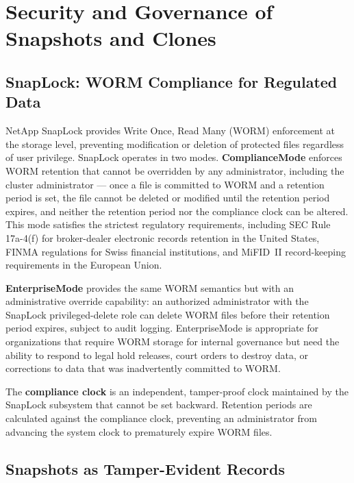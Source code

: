 \section{Security and Governance of Snapshots and Clones}

\begin{securitybox}

\subsection*{SnapLock: WORM Compliance for Regulated Data}

NetApp SnapLock provides Write Once, Read Many (WORM) enforcement at the storage level, preventing modification or deletion of protected files regardless of user privilege. SnapLock operates in two modes. \textbf{ComplianceMode} enforces WORM retention that cannot be overridden by any administrator, including the cluster administrator --- once a file is committed to WORM and a retention period is set, the file cannot be deleted or modified until the retention period expires, and neither the retention period nor the compliance clock can be altered. This mode satisfies the strictest regulatory requirements, including SEC Rule 17a-4(f) for broker-dealer electronic records retention in the United States, FINMA regulations for Swiss financial institutions, and MiFID~II record-keeping requirements in the European Union.

\textbf{EnterpriseMode} provides the same WORM semantics but with an administrative override capability: an authorized administrator with the SnapLock privileged-delete role can delete WORM files before their retention period expires, subject to audit logging. EnterpriseMode is appropriate for organizations that require WORM storage for internal governance but need the ability to respond to legal hold releases, court orders to destroy data, or corrections to data that was inadvertently committed to WORM.

The \textbf{compliance clock} is an independent, tamper-proof clock maintained by the SnapLock subsystem that cannot be set backward. Retention periods are calculated against the compliance clock, preventing an administrator from advancing the system clock to prematurely expire WORM files.

\subsection*{Snapshots as Tamper-Evident Records}


\end{securitybox}
